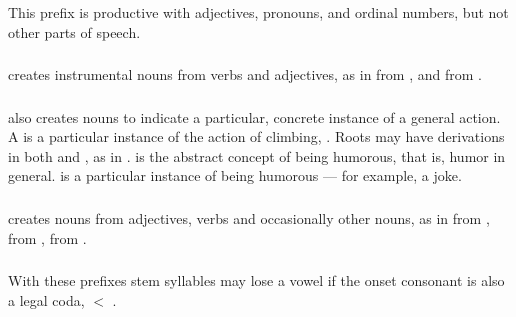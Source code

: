 This prefix is productive with adjectives, pronouns, and ordinal
numbers, but not other parts of speech.

\subsubsection{}  creates instrumental nouns from verbs and
adjectives, as in   from
, and   from 
. 

\subsubsection{}  also creates nouns to indicate a particular,
concrete instance of a general action. A   is a
particular instance of the action of climbing, .  Roots may
have derivations in both  and , as in 
.   is the abstract concept of being humorous,
that is, humor in general.   is a particular instance of being
humorous --- for example, a joke.\\

\subsubsection{}  creates nouns from adjectives, verbs and
occasionally other nouns, as in   from
 ,   from
 ,   from 
. 

\subsubsection{} With these prefixes stem syllables may lose a vowel
if the onset consonant is also a legal coda, 
 $<$  .


